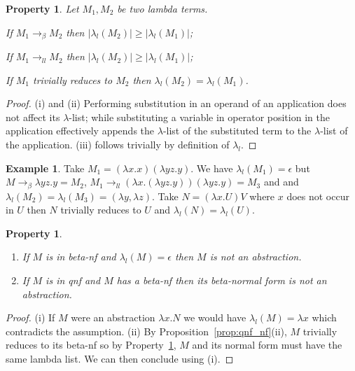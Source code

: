 \documentclass{elsarticle}
\theoremstyle{plain}
\newtheorem{property}[theorem]{Property}
\theoremstyle{definition}
\newtheorem{example}{Example}[section]
\newcommand{\llred}{\rightarrow_{ll}}
\begin{document}

\begin{property}
\label{property:lambdalist_linearred}
    Let $M_1, M_2$ be two lambda terms.
    \begin{enumerate*}[noitemsep,label=(\roman*)]
        \item If $M_1 \rightarrow_\beta M_2$ then $|\lambda_l(M_2)| \geq
        |\lambda_l(M_1)|$;
        \item If $M_1 \llred M_2$ then $|\lambda_l(M_2)| \geq
        |\lambda_l(M_1)|$;
        \item If $M_1$ trivially reduces to $M_2$ then $\lambda_l(M_2) =
        \lambda_l(M_1)$.
    \end{enumerate*}
\end{property}
\begin{proof}
    (i) and (ii) Performing substitution in an operand of an application does not affect its $\lambda$-list; while substituting a variable in operator position in the application effectively appends the $\lambda$-list of the substituted term to the $\lambda$-list of the application.
    (iii) follows trivially by definition of $\lambda_l$.
\end{proof}
\begin{example}
Take $M_1 = (\lambda x . x) (\lambda y z . y)$. We have $\lambda_l(M_1) = \epsilon$ but $M \rightarrow_\beta \lambda y z . y = M_2$,
$M_1 \llred (\lambda x . (\lambda y z . y)) (\lambda y z . y) = M_3$ and
and $\lambda_l(M_2) = \lambda_l(M_3) = (\lambda y, \lambda z)$.
Take $N = (\lambda x . U) V$ where $x$ does not occur in $U$ then $N$ trivially reduces to $U$ and $\lambda_l(N) = \lambda_l(U)$.
\end{example}

\begin{property}
\label{prop:qnf_betanf_empty_lambdalist}
    \begin{enumerate}[noitemsep,label=(\roman*)]
    \item If $M$ is in beta-nf and $\lambda_l(M) = \epsilon$ then $M$ is not an abstraction.
    \item If $M$ is in \emph{qnf} and $M$ has a beta-nf then its beta-normal form is not an abstraction.
    \end{enumerate}
\end{property}
\begin{proof}
(i) If $M$ were an abstraction $\lambda x. N$ we would have $\lambda_l(M) = \lambda x$ which contradicts the assumption.
(ii) By Proposition~\ref{prop:qnf_nf}(ii), $M$ trivially reduces to
its beta-nf so by Property~\ref{property:lambdalist_linearred},
$M$ and its normal form must have the same lambda list. We can then conclude using (i).
\end{proof}
\end{document}
